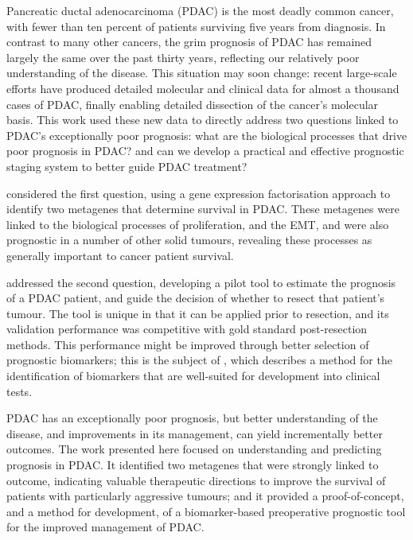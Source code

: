 \noindent Pancreatic ductal adenocarcinoma (PDAC) is the most deadly common cancer, with fewer than ten percent of patients surviving five years from diagnosis.  In contrast to many other cancers, the grim prognosis of PDAC has remained largely the same over the past thirty years, reflecting our relatively poor understanding of the disease.  This situation may soon change: recent large-scale efforts have produced detailed molecular and clinical data for almost a thousand cases of PDAC, finally enabling detailed dissection of the cancer's molecular basis.  This work used these new data to directly address two questions linked to PDAC's exceptionally poor prognosis: what are the biological processes that drive poor prognosis in PDAC? and can we develop a practical and effective prognostic staging system to better guide PDAC treatment?
\par
{} considered the first question, using a gene expression factorisation approach to identify two metagenes that determine survival in PDAC.  These metagenes were linked to the biological processes of proliferation, and the EMT, and were also prognostic in a number of other solid tumours, revealing these processes as generally important to cancer patient survival.  
\par
{} addressed the second question, developing a pilot tool to estimate the prognosis of a PDAC patient, and guide the decision of whether to resect that patient's tumour.  The tool is unique in that it can be applied prior to resection, and its validation performance was competitive with gold standard post-resection methods.  This performance might be improved through better selection of prognostic biomarkers; this is the subject of , which describes a method for the identification of biomarkers that are well-suited for development into clinical tests.
\par
PDAC has an exceptionally poor prognosis, but better understanding of the disease, and improvements in its management, can yield incrementally better outcomes.  The work presented here focused on understanding and predicting prognosis in PDAC.  It identified two metagenes that were strongly linked to outcome, indicating valuable therapeutic directions to improve the survival of patients with particularly aggressive tumours; and it provided a proof-of-concept, and a method for development, of a biomarker-based preoperative prognostic tool for the improved management of PDAC.
